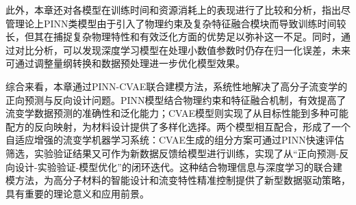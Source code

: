 此外，本章还对各模型在训练时间和资源消耗上的表现进行了比较和分析，指出尽管理论上PINN类模型由于引入了物理约束及复杂特征融合模块而导致训练时间较长，但其在捕捉复杂物理特性和有效泛化方面的优势足以弥补这一不足。同时，通过对比分析，可以发现深度学习模型在处理小数值参数时仍存在归一化误差，未来可通过调整量纲转换和数据预处理进一步优化模型效果。

综合来看，本章通过PINN-CVAE联合建模方法，系统性地解决了高分子流变学的正向预测与反向设计问题。PINN模型结合物理约束和特征融合机制，有效提高了流变学数据预测的准确性和泛化能力；CVAE模型则实现了从目标性能到多种可能配方的反向映射，为材料设计提供了多样化选择。两个模型相互配合，形成了一个自适应增强的流变学机器学习系统：CVAE生成的组分方案可通过PINN快速评估筛选，实验验证结果又可作为新数据反馈给模型进行训练，实现了从“正向预测-反向设计-实验验证-模型优化”的闭环迭代。这种结合物理信息与深度学习的联合建模方法，为高分子材料的智能设计和流变特性精准控制提供了新型数据驱动策略，具有重要的理论意义和应用前景。
